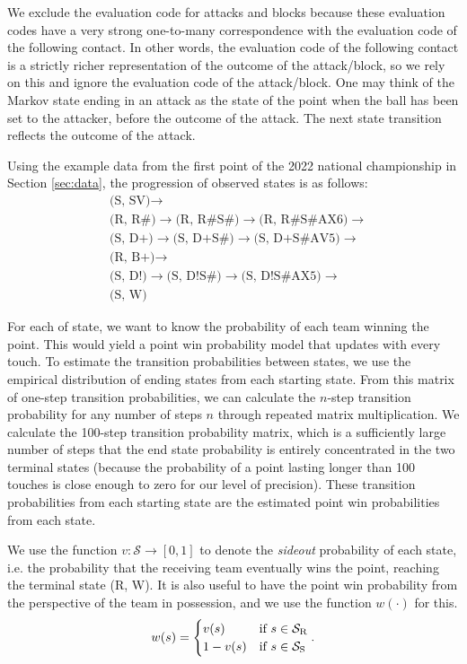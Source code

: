 \documentclass{article}
\begin{document}
We exclude the evaluation code for attacks and blocks because these evaluation codes have a very strong one-to-many correspondence with the evaluation code of the following contact. In other words, the evaluation code of the following contact is a strictly richer representation of the outcome of the attack/block, so we rely on this and ignore the evaluation code of the attack/block. One may think of the Markov state ending in an attack as the state of the point when the ball has been set to the attacker, before the outcome of the attack. The next state transition reflects the outcome of the attack.

Using the example data from the first point of the 2022 national championship in Section \ref{sec:data}, the progression of observed states is as follows:
\begin{align*}
    &\mbox{(S, SV)}  \rightarrow\\
    &\mbox{(R, R\#)} \rightarrow \mbox{(R, R\#S\#)} \rightarrow \mbox{(R, R\#S\#AX6)} \rightarrow\\
    &\mbox{(S, D+)}  \rightarrow \mbox{(S, D+S\#)}  \rightarrow \mbox{(S, D+S\#AV5)}  \rightarrow\\
    &\mbox{(R, B+)}  \rightarrow\\
    &\mbox{(S, D!)}  \rightarrow \mbox{(S, D!S\#)}  \rightarrow \mbox{(S, D!S\#AX5)}  \rightarrow\\
    &\mbox{(S, W)}
\end{align*}

For each of state, we want to know the probability of each team winning the point. This would yield a point win probability model that updates with every touch. To estimate the transition probabilities between states, we use the empirical distribution of ending states from each starting state. From this matrix of one-step transition probabilities, we can calculate the $n$-step transition probability for any number of steps $n$ through repeated matrix multiplication. We calculate the 100-step transition probability matrix, which is a sufficiently large number of steps that the end state probability is entirely concentrated in the two terminal states (because the probability of a point lasting longer than 100 touches is close enough to zero for our level of precision). These transition probabilities from each starting state are the estimated point win probabilities from each state.

We use the function $v: \mathcal{S} \rightarrow [0, 1]$ to denote the {\it sideout} probability of each state, i.e. the probability that the receiving team eventually wins the point, reaching the terminal state (R, W). It is also useful to have the point win probability from the perspective of the team in possession, and we use the function $w(\cdot)$ for this.
\begin{equation*}
    w(s) = \begin{cases}
        v(s)        & \mbox{if } s \in \mathcal{S}_{\mbox{\scriptsize R}}\\
        1 - v(s)    & \mbox{if } s \in \mathcal{S}_{\mbox{\scriptsize S}}
    \end{cases}.
\end{equation*}
\end{document}
